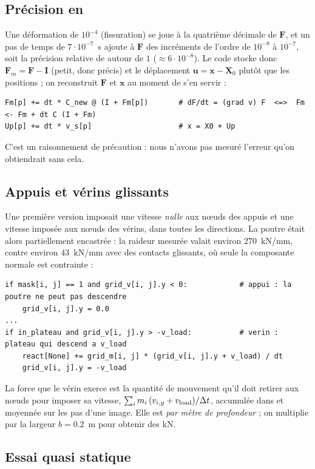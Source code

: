 \documentclass[11pt,a4paper]{article}
\newcommand{\code}[1]{\texttt{\detokenize{#1}}}
\begin{document}
\subsection{Précision en \code{float32}}

Une déformation de $10^{-4}$ (fissuration) se joue à la quatrième décimale de $\mathbf F$, et un
pas de temps de $7\cdot10^{-7}$~s ajoute à $\mathbf F$ des incréments de l'ordre de $10^{-8}$ à $10^{-7}$,
soit la précision relative de \code{float32} autour de $1$ ($\approx 6\cdot10^{-8}$). Le code stocke donc
$\mathbf F_m = \mathbf F - \mathbf I$ (petit, donc précis) et le déplacement $\mathbf u = \mathbf x - \mathbf X_0$ plutôt
que les positions ; on reconstruit $\mathbf F$ et $\mathbf x$ au moment de s'en servir :
\begin{lstlisting}
Fm[p] += dt * C_new @ (I + Fm[p])       # dF/dt = (grad v) F  <=>  Fm <- Fm + dt C (I + Fm)
Up[p] += dt * v_s[p]                    # x = X0 + Up
\end{lstlisting}
C'est un raisonnement de précaution : nous n'avons pas mesuré l'erreur qu'on obtiendrait sans cela.

\subsection{Appuis et vérins glissants}

Une première version imposait une vitesse \emph{nulle} aux n\oe uds des appuis et une vitesse
imposée aux n\oe uds des vérins, dans toutes les directions. La poutre était alors partiellement
encastrée : la raideur mesurée valait environ $270$~kN/mm, contre environ $43$~kN/mm avec des
contacts glissants, où seule la composante normale est contrainte :
\begin{lstlisting}
if mask[i, j] == 1 and grid_v[i, j].y < 0:            # appui : la poutre ne peut pas descendre
    grid_v[i, j].y = 0.0
...
if in_plateau and grid_v[i, j].y > -v_load:           # verin : plateau qui descend a v_load
    react[None] += grid_m[i, j] * (grid_v[i, j].y + v_load) / dt
    grid_v[i, j].y = -v_load
\end{lstlisting}
La force que le vérin exerce est la quantité de mouvement qu'il doit retirer aux n\oe uds pour
imposer sa vitesse, $\sum_i m_i\,(v_{i,y} + v_{\rm load})/\Delta t$, accumulée dans \code{react}
et moyennée sur les pas d'une image. Elle est \emph{par mètre de profondeur} ; on multiplie par
la largeur $b = 0.2$~m pour obtenir des kN.

\subsection{Essai quasi statique}
\end{document}
